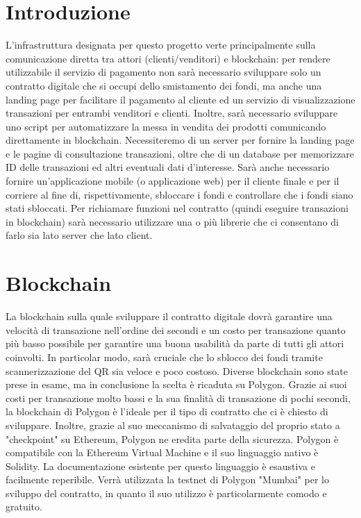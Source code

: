 \documentclass[a4paper, 12pt]{article}
\begin{document}
\makefrontpage

\makeversioni

\section*{Introduzione}
L'infrastruttura designata per questo progetto verte principalmente sulla comunicazione diretta tra attori (clienti/venditori) e blockchain: per rendere utilizzabile il servizio di pagamento non sarà necessario sviluppare solo un contratto digitale che si occupi dello smistamento dei fondi, ma anche una landing page per facilitare il pagamento al cliente ed un servizio di visualizzazione transazioni per entrambi venditori e clienti.
Inoltre, sarà necessario sviluppare uno script per automatizzare la messa in vendita dei prodotti comunicando direttamente in blockchain.
Necessiteremo di un server per fornire la landing page e le pagine di consultazione transazioni, oltre che di un database per memorizzare ID delle transazioni ed altri eventuali dati d'interesse.
Sarà anche necessario fornire un'applicazione mobile (o applicazione web) per il cliente finale e per il corriere al fine di, rispettivamente, sbloccare i fondi e controllare che i fondi siano stati sbloccati.
Per richiamare funzioni nel contratto (quindi eseguire transazioni in blockchain) sarà necessario utilizzare una o più librerie che ci consentano di farlo sia lato server che lato client.

\section*{Blockchain}
La blockchain sulla quale sviluppare il contratto digitale dovrà garantire una velocità di transazione nell'ordine dei secondi e un costo per transazione quanto più basso possibile per garantire una buona usabilità da parte di tutti gli attori coinvolti. In particolar modo, sarà cruciale che lo sblocco dei fondi tramite scannerizzazione del QR sia veloce e poco costoso.
Diverse blockchain sono state prese in esame, ma in conclusione la scelta è ricaduta su Polygon.
Grazie ai suoi costi per transazione molto bassi e la sua finalità di transazione di pochi secondi, la blockchain di Polygon è l'ideale per il tipo di contratto che ci è chiesto di sviluppare.
Inoltre, grazie al suo meccanismo di salvataggio del proprio stato a "checkpoint" su Ethereum, Polygon ne eredita parte della sicurezza.
Polygon è compatibile con la Ethereum Virtual Machine e il suo linguaggio nativo è Solidity. La documentazione esistente per questo linguaggio è esaustiva e facilmente reperibile.
Verrà utilizzata la testnet di Polygon "Mumbai" per lo sviluppo del contratto, in quanto il suo utilizzo è particolarmente comodo e gratuito.
\end{document}
